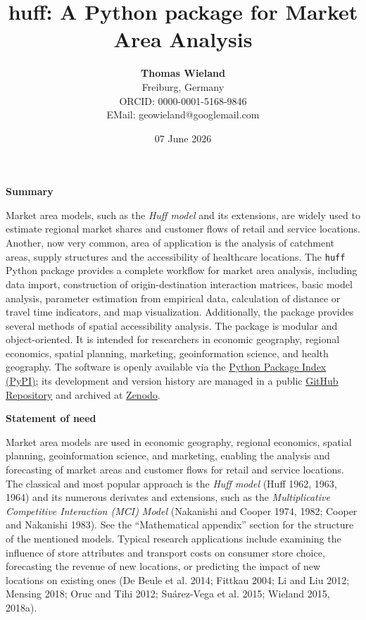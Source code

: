 \documentclass[
]{article}
\title{huff: A Python package for Market Area Analysis}
\author{\textbf{Thomas Wieland}\\
Freiburg, Germany\\
ORCID: 0000-0001-5168-9846\\
EMail: geowieland@googlemail.com}
\date{07 June 2026}
\begin{document}
\maketitle

\textbf{Summary}

Market area models, such as the \emph{Huff model} and its extensions,
are widely used to estimate regional market shares and customer flows of
retail and service locations. Another, now very common, area of
\hspace{0pt}\hspace{0pt}application is the analysis of catchment areas,
supply structures and the accessibility of healthcare locations. The
\texttt{huff} Python package provides a complete workflow for market
area analysis, including data import, construction of origin-destination
interaction matrices, basic model analysis, parameter estimation from
empirical data, calculation of distance or travel time indicators, and
map visualization. Additionally, the package provides several methods of
spatial accessibility analysis. The package is modular and
object-oriented. It is intended for researchers in economic geography,
regional economics, spatial planning, marketing, geoinformation science,
and health geography. The software is openly available via the
\href{https://pypi.org/project/huff/}{Python Package Index (PyPI)}; its
development and version history are managed in a public
\href{https://github.com/geowieland/huff_official}{GitHub Repository}
and archived at \href{https://doi.org/10.5281/zenodo.18639559}{Zenodo}.

\textbf{Statement of need}

Market area models are used in economic geography, regional economics,
spatial planning, geoinformation science, and marketing, enabling the
analysis and forecasting of market areas and customer flows for retail
and service locations. The classical and most popular approach is the
\emph{Huff model} (Huff 1962, 1963, 1964) and its numerous derivates and
extensions, such as the \emph{Multiplicative Competitive Interaction
(MCI) Model} (Nakanishi and Cooper 1974, 1982; Cooper and Nakanishi
1983). See the ``Mathematical appendix'' section for the structure of
the mentioned models. Typical research applications include examining
the influence of store attributes and transport costs on consumer store
choice, forecasting the revenue of new locations, or predicting the
impact of new locations on existing ones (De Beule et al. 2014; Fittkau
2004; Li and Liu 2012; Mensing 2018; Oruc and Tihi 2012; Suárez-Vega et
al. 2015; Wieland 2015, 2018a).
\end{document}
